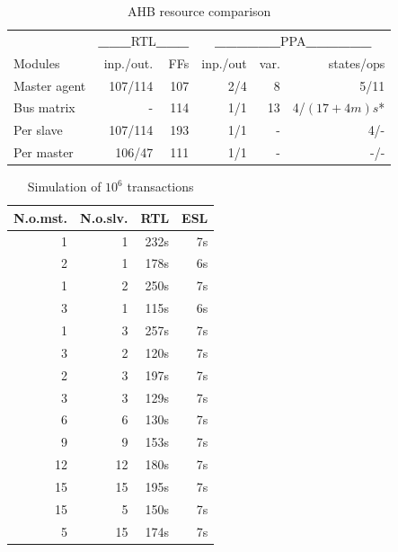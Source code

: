 \begin{table}[hbt] 
  \label{tab:stats}
  \begin{tabular}{ l r r r r r}
  \hline 
  \hline
      & \multicolumn{2}{c}{\textbf{\_\_\_}RTL\textbf{\_\_\_}} & \multicolumn{3}{c}{\textbf{\_\_\_\_\_\_}PPA\textbf{\_\_\_\_\_\_}} \\
  Modules & inp./out. & FFs & inp./out & var. & states/ops \\
    \hline
  Master agent & 107/114 & 107 & 2/4 & 8 & 5/11 \\
  \hline
  Bus matrix & - & 114 & 1/1 & 13 & 4/$(17+4m)s$* \\
  
  Per slave & 107/114 & 193 & 1/1 & - & 4/- \\
 
  Per master & 106/47 & 111 & 1/1 & - & -/- \\
    \hline
    \hline  
  \end{tabular}
\caption{AHB resource comparison}
\end{table}


\begin{table}[hbt] 
  \label{tab:stats}
  \begin{tabular}{ r r r r }
  \hline 
  \hline
    N.o.mst.  & N.o.slv. & RTL & ESL \\
    \hline
      1 & 1 & 232s & 7s \\
  
      2 & 1 & 178s & 6s \\
  
      1 & 2 & 250s & 7s \\
 
      3 & 1 & 115s & 6s \\

      1 & 3 & 257s & 7s \\

      3 & 2 & 120s & 7s \\
 
      2 & 3 & 197s & 7s \\

      3 & 3 & 129s & 7s \\

      6 & 6 & 130s & 7s \\

      9 & 9 & 153s & 7s \\

      12 & 12 & 180s & 7s \\

      15 & 15 & 195s & 7s \\

      15 & 5 & 150s & 7s \\

      5 & 15 & 174s & 7s \\
    \hline
    \hline  
  \end{tabular}
\caption{Simulation of $10^6$ transactions}
\end{table}

